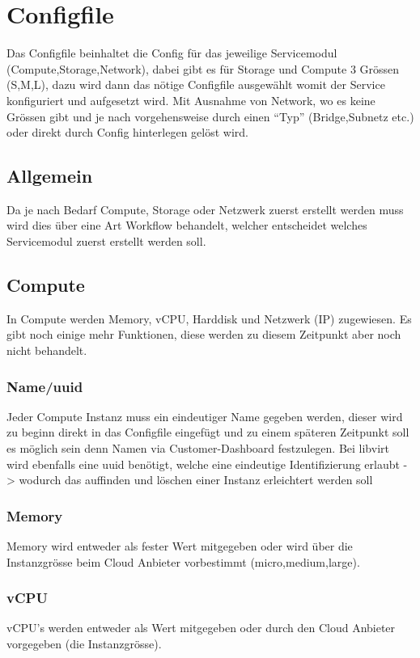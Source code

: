
\section{Configfile}
Das Configfile beinhaltet die Config für das jeweilige Servicemodul 
(Compute,Storage,Network), dabei gibt es für Storage und Compute 3 Grössen 
(S,M,L), dazu wird dann das nötige Configfile ausgewählt womit der Service 
konfiguriert und aufgesetzt wird.
Mit Ausnahme von Network, wo es keine Grössen gibt und  je nach vorgehensweise 
durch einen ``Typ'' (Bridge,Subnetz etc.) oder direkt durch Config hinterlegen gelöst wird.

\subsection{Allgemein}
Da je nach Bedarf Compute, Storage oder Netzwerk zuerst erstellt werden muss 
wird dies über eine Art Workflow behandelt, welcher entscheidet welches
Servicemodul zuerst erstellt werden soll.

\subsection{Compute}
In Compute werden Memory, vCPU, Harddisk und Netzwerk (IP) zugewiesen.
Es gibt noch einige mehr Funktionen, diese werden zu diesem Zeitpunkt aber noch 
nicht behandelt.

\subsubsection{Name/uuid}
Jeder Compute Instanz muss ein eindeutiger Name gegeben werden, dieser wird zu 
beginn direkt in das Configfile eingefügt und zu einem späteren Zeitpunkt soll 
es möglich sein denn Namen via Customer-Dashboard festzulegen.
Bei libvirt wird ebenfalls eine uuid benötigt, welche eine eindeutige 
Identifizierung erlaubt -> wodurch das auffinden und löschen einer Instanz 
erleichtert werden soll

\subsubsection{Memory}
Memory wird entweder als fester Wert mitgegeben oder wird über die Instanzgrösse 
beim Cloud Anbieter vorbestimmt (micro,medium,large).

\subsubsection{vCPU}
vCPU's werden entweder als Wert mitgegeben oder durch den Cloud Anbieter vorgegeben (die Instanzgrösse). 

